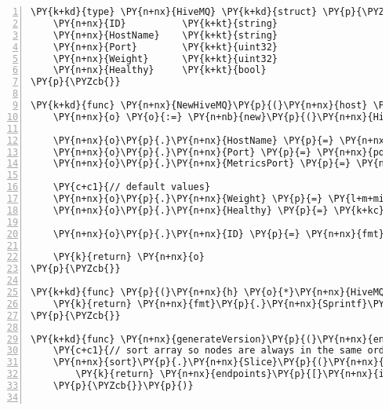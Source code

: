 \begin{Verbatim}[commandchars=\\\{\},numbers=left,firstnumber=1,stepnumber=1,frame=single]
\PY{k+kd}{type} \PY{n+nx}{HiveMQ} \PY{k+kd}{struct} \PY{p}{\PYZob{}}
	\PY{n+nx}{ID}          \PY{k+kt}{string}
	\PY{n+nx}{HostName}    \PY{k+kt}{string}
	\PY{n+nx}{Port}        \PY{k+kt}{uint32}
	\PY{n+nx}{Weight}      \PY{k+kt}{uint32}
	\PY{n+nx}{Healthy}     \PY{k+kt}{bool}
\PY{p}{\PYZcb{}}

\PY{k+kd}{func} \PY{n+nx}{NewHiveMQ}\PY{p}{(}\PY{n+nx}{host} \PY{k+kt}{string}\PY{p}{,} \PY{n+nx}{port} \PY{k+kt}{uint32}\PY{p}{)} \PY{o}{*}\PY{n+nx}{HiveMQ} \PY{p}{\PYZob{}}
	\PY{n+nx}{o} \PY{o}{:=} \PY{n+nb}{new}\PY{p}{(}\PY{n+nx}{HiveMQ}\PY{p}{)}

	\PY{n+nx}{o}\PY{p}{.}\PY{n+nx}{HostName} \PY{p}{=} \PY{n+nx}{host}
	\PY{n+nx}{o}\PY{p}{.}\PY{n+nx}{Port} \PY{p}{=} \PY{n+nx}{port}
	\PY{n+nx}{o}\PY{p}{.}\PY{n+nx}{MetricsPort} \PY{p}{=} \PY{n+nx}{metricsPort}

	\PY{c+c1}{// default values}
	\PY{n+nx}{o}\PY{p}{.}\PY{n+nx}{Weight} \PY{p}{=} \PY{l+m+mi}{1}
	\PY{n+nx}{o}\PY{p}{.}\PY{n+nx}{Healthy} \PY{p}{=} \PY{k+kc}{false}

	\PY{n+nx}{o}\PY{p}{.}\PY{n+nx}{ID} \PY{p}{=} \PY{n+nx}{fmt}\PY{p}{.}\PY{n+nx}{Sprintf}\PY{p}{(}\PY{l+s}{\PYZdq{}\PYZpc{}v:\PYZpc{}v\PYZdq{}}\PY{p}{,} \PY{n+nx}{host}\PY{p}{,} \PY{n+nx}{port}\PY{p}{)}

	\PY{k}{return} \PY{n+nx}{o}
\PY{p}{\PYZcb{}}

\PY{k+kd}{func} \PY{p}{(}\PY{n+nx}{h} \PY{o}{*}\PY{n+nx}{HiveMQ}\PY{p}{)} \PY{n+nx}{GetHashString}\PY{p}{(}\PY{p}{)} \PY{k+kt}{string} \PY{p}{\PYZob{}}
	\PY{k}{return} \PY{n+nx}{fmt}\PY{p}{.}\PY{n+nx}{Sprintf}\PY{p}{(}\PY{l+s}{\PYZdq{}\PYZpc{}v\PYZhy{}\PYZpc{}v\PYZhy{}\PYZpc{}v\PYZdq{}}\PY{p}{,} \PY{n+nx}{h}\PY{p}{.}\PY{n+nx}{ID}\PY{p}{,} \PY{n+nx}{h}\PY{p}{.}\PY{n+nx}{Weight}\PY{p}{,} \PY{n+nx}{h}\PY{p}{.}\PY{n+nx}{Healthy}\PY{p}{)}
\PY{p}{\PYZcb{}}

\PY{k+kd}{func} \PY{n+nx}{generateVersion}\PY{p}{(}\PY{n+nx}{endpoints} \PY{p}{[}\PY{p}{]}\PY{o}{*}\PY{n+nx}{HiveMQ}\PY{p}{)} \PY{k+kt}{string} \PY{p}{\PYZob{}}
	\PY{c+c1}{// sort array so nodes are always in the same order}
	\PY{n+nx}{sort}\PY{p}{.}\PY{n+nx}{Slice}\PY{p}{(}\PY{n+nx}{endpoints}\PY{p}{,} \PY{k+kd}{func}\PY{p}{(}\PY{n+nx}{i}\PY{p}{,} \PY{n+nx}{j} \PY{k+kt}{int}\PY{p}{)} \PY{k+kt}{bool} \PY{p}{\PYZob{}}
		\PY{k}{return} \PY{n+nx}{endpoints}\PY{p}{[}\PY{n+nx}{i}\PY{p}{]}\PY{p}{.}\PY{n+nx}{ID} \PY{p}{\PYZlt{}} \PY{n+nx}{endpoints}\PY{p}{[}\PY{n+nx}{j}\PY{p}{]}\PY{p}{.}\PY{n+nx}{ID}
	\PY{p}{\PYZcb{}}\PY{p}{)}


\end{Verbatim}
